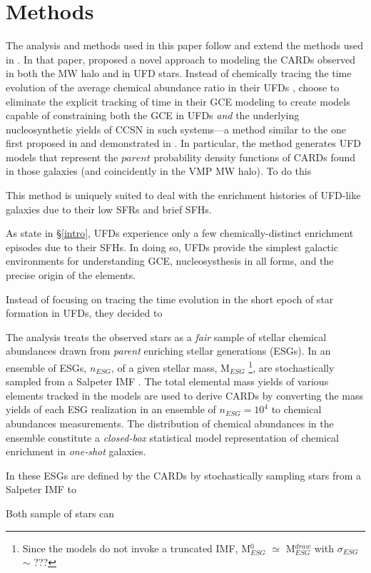\section{Methods}
\label{methods}

The analysis and methods used in this paper follow and extend the methods used in \citet{Lee_2013}. In that paper, \citet{Lee_2013} proposed a novel approach to modeling the CARDs observed in both the MW halo and in UFD stars. Instead of chemically tracing the time evolution of the average chemical abundance ratio in their UFDs , \citet{Lee_2013} choose to eliminate the explicit tracking of time in their GCE modeling to create models capable of constraining both the GCE in UFDs {\it and} the underlying nucleosynthetic yields of CCSN in such systems---a method similar to the one first proposed in \citet{Karlsson2005a} and demonstrated in \citet{Karlsson_2005b}. In particular, the method generates UFD models that represent the $parent$ probability density functions of CARDs found in those galaxies (and coincidently in the VMP MW halo). To do this

This method is uniquely suited to deal with the enrichment histories of UFD-like galaxies due to their low SFRs and brief SFHs. 

As state in \S\ref{intro}, UFDs experience only a few chemically-distinct enrichment episodes due to their SFHs. In doing so, UFDs provide the simplest galactic environments for understanding GCE, nucleosysthesis in all forms, and the precise origin of the elements. 


Instead of focusing on tracing the time evolution in the short epoch of star formation in UFDs, they decided to 



The analysis treats the observed stars as a {\it fair} sample of stellar chemical abundances drawn from {\it parent} enriching stellar generations (ESGs). In \citet{Lee_2013} an ensemble of ESGs, $n_{ESG}$, of a given stellar mass, M$_{ESG}$
\footnote{Since the models do not invoke a truncated IMF, M$_{ESG}^0$ $\simeq$ M$_{ESG}^{draw}$ with $\sigma_{ESG}$ $\sim$ ???}, 
are stochastically sampled from a Salpeter IMF \citep{Salpeter_1955}. The total elemental mass yields of various elements tracked in the models are used to derive CARDs by converting the mass yields of each ESG realization in an ensemble of $n_{ESG} = 10^4$ to chemical abundances measurements. The distribution of chemical abundances in the ensemble constitute a {\it closed-box} statistical model representation of chemical enrichment in {\it one-shot} galaxies. 


In \citet{Lee_2013} these ESGs are defined by the CARDs by stochastically sampling stars from a Salpeter IMF \citep{Salpeter_1955} to    

Both sample of stars can 